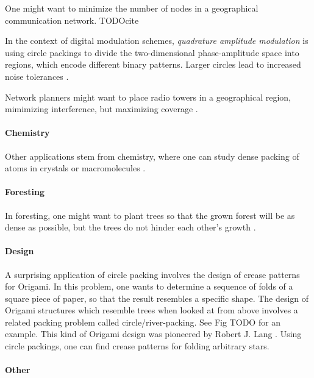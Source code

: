 \documentclass[a4paper,style=print,bibliography=totoc,nexus,lnum,extramargin]{tubsbook}
\begin{document}
One might want to minimize the number of nodes in a geographical communication network. TODOcite

In the context of digital modulation schemes, \emph{quadrature amplitude modulation} is using circle packings to divide the two-dimensional phase-amplitude space into regions, which encode different binary patterns. Larger circles lead to increased noise tolerances \parencite{PWMD1992packing}.

Network planners might want to place radio towers in a geographical region, mimimizing interference, but maximizing coverage \parencite{SMCSCG2007new}.

\paragraph{Chemistry}

Other applications stem from chemistry, where one can study dense packing of atoms in crystals or macromolecules \cite{WMP1994history}.

\paragraph{Foresting}

In foresting, one might want to plant trees so that the grown forest will be as dense as possible, but the trees do not hinder each other's growth \cite{SMCSCG2007new}.

\paragraph{Design}

A surprising application of circle packing involves the design of crease patterns for Origami. In this problem, one wants to determine a sequence of folds of a square piece of paper, so that the result resembles a specific shape. The design of Origami structures which resemble trees when looked at from above involves a related packing problem called circle/river-packing. See Fig TODO for an example. This kind of Origami design was pioneered by Robert J. Lang \cite{lang1996computational}. Using circle packings, one can find crease patterns for folding arbitrary stars.


\paragraph{Other}
\end{document}

